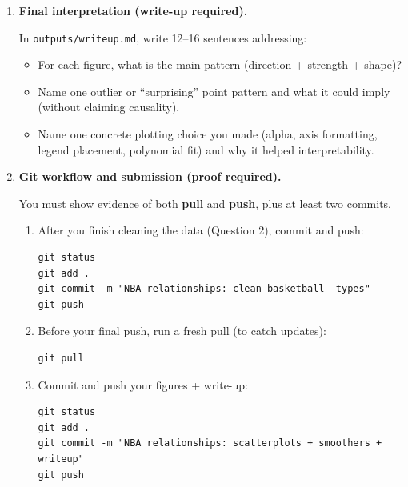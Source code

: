 \documentclass[11pt]{article}
\begin{document}
\begin{enumerate}
  \noindent \textbf{Write-up (3--5 sentences):}
  \begin{itemize}
    \item Does a quadratic fit capture the shape better than a straight line would?
    \item Where is the SE ribbon widest, and what does that tell you about sample density at those ages?
    \item Based on the curve, at roughly what age does scoring efficiency appear to peak?
  \end{itemize}

  \noindent Save as:
  \[
    \texttt{figures/age\_ts\_poly2\_se.png}
  \]

  \item \textbf{Final interpretation (write-up required).}

  In \texttt{outputs/writeup.md}, write 12--16 sentences addressing:
  \begin{itemize}
    \item For each figure, what is the main pattern (direction + strength + shape)?
    \item Name one outlier or ``surprising'' point pattern and what it could imply (without claiming causality).
    \item Name one concrete plotting choice you made (alpha, axis formatting, legend placement, polynomial fit) and why it helped interpretability.
  \end{itemize}

  \item \textbf{Git workflow and submission (proof required).}

  You must show evidence of both \textbf{pull} and \textbf{push}, plus at least two commits.

  \begin{enumerate}
    \item After you finish cleaning the data (Question 2), commit and push:
\begin{verbatim}
git status
git add .
git commit -m "NBA relationships: clean basketball  types"
git push
\end{verbatim}

    \item Before your final push, run a fresh pull (to catch updates):
\begin{verbatim}
git pull
\end{verbatim}

    \item Commit and push your figures + write-up:
\begin{verbatim}
git status
git add .
git commit -m "NBA relationships: scatterplots + smoothers + writeup"
git push
\end{verbatim}


\end{enumerate}
\end{enumerate}
\end{document}
